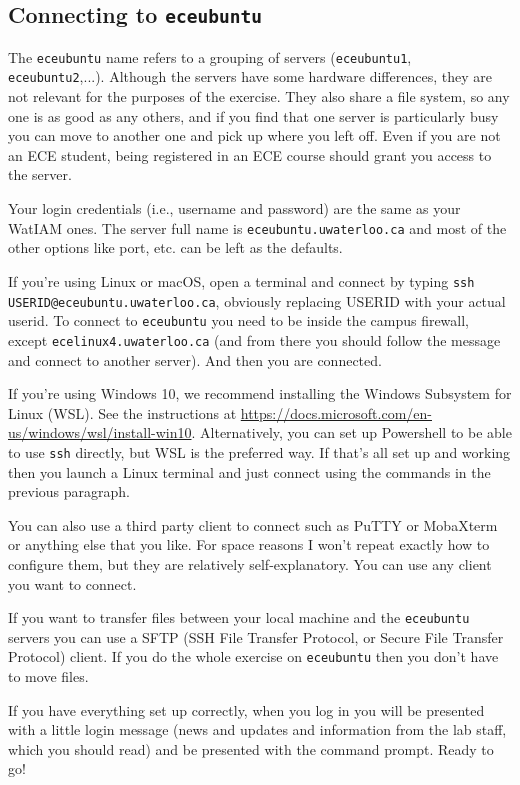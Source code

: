 \subsection*{Connecting to \texttt{eceubuntu}}

The \texttt{eceubuntu} name refers to a grouping of servers (\texttt{eceubuntu1}, \texttt{eceubuntu2},...). Although the servers have some hardware differences, they are not relevant for the purposes of the exercise. They also share a file system, so any one is as good as any others, and if you find that one server is particularly busy you can move to another one and pick up where you left off. Even if you are not an ECE student, being registered in an ECE course should grant you access to the server.

Your login credentials (i.e., username and password) are the same as your WatIAM ones. The server full name is \texttt{eceubuntu.uwaterloo.ca} and most of the other options like port, etc. can be left as the defaults.

If you're using Linux or macOS, open a terminal and connect by typing \texttt{ssh USERID@eceubuntu.uwaterloo.ca}, obviously replacing USERID with your actual userid. To connect to \texttt{eceubuntu} you need to be inside the campus firewall, except \texttt{ecelinux4.uwaterloo.ca} (and from there you should follow the message and connect to another server). And then you are connected.

If you're using Windows 10, we recommend installing the Windows Subsystem for Linux (WSL). See the instructions at \url{https://docs.microsoft.com/en-us/windows/wsl/install-win10}. Alternatively, you can set up Powershell to be able to use \texttt{ssh} directly, but WSL is the preferred way. If that's all set up and working then you launch a Linux terminal and just connect using the commands in the previous paragraph.

You can also use a third party client to connect such as PuTTY or MobaXterm or anything else that you like. For space reasons I won't repeat exactly how to configure them, but they are relatively self-explanatory. You can use any client you want to connect.

If you want to transfer files between your local machine and the \texttt{eceubuntu} servers you can use a SFTP (SSH File Transfer Protocol, or Secure File Transfer Protocol) client. If you do the whole exercise on \texttt{eceubuntu} then you don't have to move files.

If you have everything set up correctly, when you log in you will be presented with a little login message (news and updates and information from the lab staff, which you should read) and be presented with the command prompt. Ready to go!

